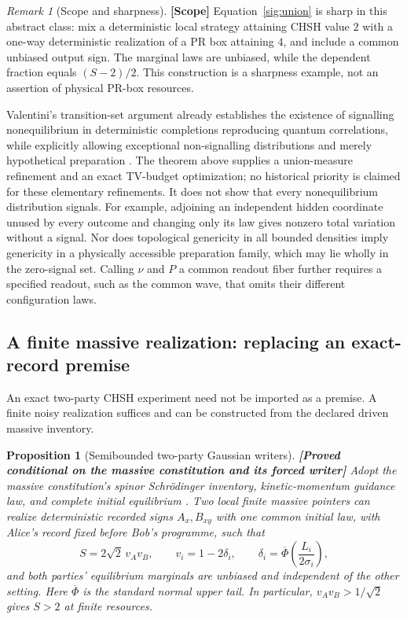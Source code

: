 \documentclass[11pt,a4paper]{article}
\newtheorem{proposition}[theorem]{Proposition}
\theoremstyle{definition}
\theoremstyle{remark}\newtheorem{remark}[theorem]{Remark}
\newcommand{\status}[1]{\textbf{[#1]}\quad}
\begin{document}
\begin{remark}[Scope and sharpness]
\status{Scope}
\label{sig:scope}
Equation~\eqref{sig:union} is sharp in this abstract class: mix a
deterministic local strategy attaining CHSH value $2$ with a one-way
deterministic realization of a PR box attaining $4$, and include a common
unbiased output sign. The marginal laws are unbiased, while the
dependent fraction equals $(S-2)/2$. This construction is a sharpness
example, not an assertion of physical PR-box resources.

Valentini's transition-set argument already establishes the existence
of signalling nonequilibrium in deterministic completions reproducing
quantum correlations, while explicitly allowing exceptional
non-signalling distributions and merely hypothetical preparation
\cite{V02}. The theorem above supplies a union-measure refinement and an
exact TV-budget optimization; no historical priority is claimed for
these elementary refinements. It does not show that every
nonequilibrium distribution signals. For example, adjoining an
independent hidden coordinate unused by every outcome and changing only
its law gives nonzero total variation without a signal. Nor does
topological genericity in all bounded densities imply genericity in a
physically accessible preparation family, which may lie wholly in the
zero-signal set. Calling $\nu$ and $P$ a common readout fiber further
requires a specified readout, such as the common wave, that omits their
different configuration laws.
\end{remark}

\subsection{A finite massive realization: replacing an exact-record premise}

An exact two-party CHSH experiment need not be imported as a premise. A finite noisy realization suffices and can be
constructed from the declared driven massive inventory.

\begin{proposition}[Semibounded two-party Gaussian writers]
\label{sig:massive}
\status{Proved conditional on the massive constitution and its forced writer}
Adopt the massive constitution's spinor Schr\"odinger inventory,
kinetic-momentum guidance law, and complete initial equilibrium
\cite[labels \texttt{mc:ax:material}, \texttt{mc:ax:motion},
\texttt{mc:ax:eq}]{RM}. Two local finite massive pointers can realize
deterministic recorded signs $A_x,B_{xy}$ with one common initial law,
with Alice's record fixed before Bob's programme, such that
\begin{equation}\label{sig:massiveCHSH}
 S=2\sqrt2\,v_Av_B,\qquad
 v_i=1-2\delta_i,\qquad
 \delta_i=\overline\Phi\!\left(\frac{L_i}{2\sigma_i}\right),
\end{equation}
and both parties' equilibrium marginals are unbiased and independent of
the other setting. Here $\overline\Phi$ is the standard normal upper
tail. In particular, $v_Av_B>1/\sqrt2$ gives $S>2$ at finite resources.
\end{proposition}
\end{document}

